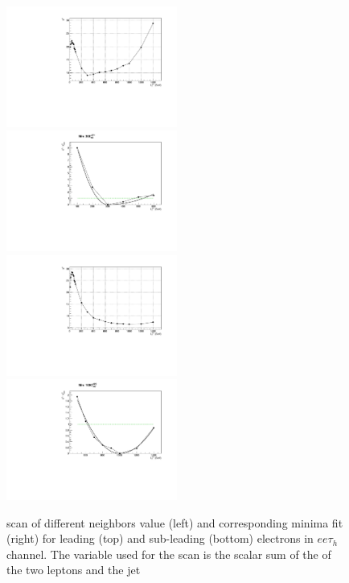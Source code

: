 \begin{figure}
\includegraphics[width=0.5\textwidth]{4_Analisys/pics/8TeV/ProfileNeighbors/EE/eid12Tight_h2taucuts/LT_chi2.pdf}
\includegraphics[width=0.5\textwidth]{4_Analisys/pics/8TeV/ProfileNeighbors/EE/eid12Tight_h2taucuts_LT.pdf} \\
\includegraphics[width=0.5\textwidth]{4_Analisys/pics/8TeV/ProfileNeighbors/EE/eid12Medium_h2taucuts020/LT_chi2.pdf}
\includegraphics[width=0.5\textwidth]{4_Analisys/pics/8TeV/ProfileNeighbors/EE/eid12Medium_h2taucuts020_LT.pdf} \\
\caption{\chisq scan of different neighbors value (left) and corresponding minima fit (right) for leading (top) and sub-leading (bottom) electrons in $ee\tau_h$ channel. The variable used for the scan is the scalar sum of the \pT of the two leptons and the jet}
\label{fig:kNN_minima_EET}
\end{figure}

